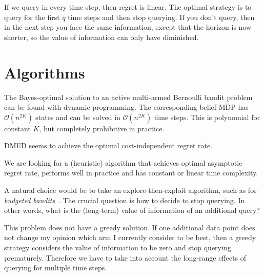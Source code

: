 \documentclass[a4paper]{article}
\begin{document}


If we query in every time step, then regret is linear.
The optimal strategy is to query for the first $q$ time steps and then stop querying.
If you don't query, then in the next step you face the same information, except that the horizon is now shorter,
so the value of information can only have diminished.



\section{Algorithms}

The Bayes-optimal solution to an active multi-armed Bernoulli bandit problem can be found with dynamic programming.
The corresponding belief MDP has $\mathcal{O}(n^{2K})$ states
and can be solved in $\mathcal{O}(n^{2K})$ time steps.
This is polynomial for constant $K$,
but completely prohibitive in practice.

DMED seems to achieve the optimal cost-independent regret rate.

We are looking for a (heuristic) algorithm that achieves optimal asymptotic regret rate, performs well in practice and has constant or linear time complexity.

A natural choice would be to take an explore-then-exploit algorithm, such as for \emph{budgeted bandits}~\citep{Madani04}.
The crucial question is how to decide to stop querying.
In other words, what is the (long-term) value of information of an additional query?

This problem does not have a greedy solution.
If one additional data point does not change my opinion
which arm I currently consider to be best,
then a greedy strategy considers the value of information to be zero and stop querying prematurely.
Therefore we have to take into account the long-range effects of querying for multiple time steps.
\end{document}
